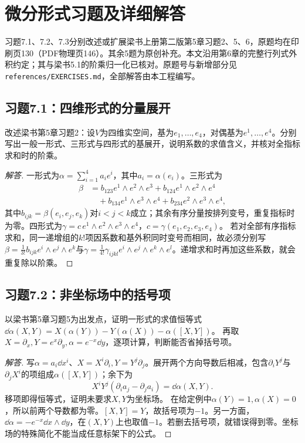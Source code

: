 \section{微分形式习题及详细解答}
习题7.1、7.2、7.3分别改述或扩展梁书上册第二版第5章习题2、5、6，原题均在印刷页130（PDF物理页146）。其余5题为原创补充。本文沿用第6章的完整行列式外积约定；其与梁书5.1的阶乘归一化已核对。原题号与新增部分见\texttt{references/EXERCISES.md}，全部解答由本工程编写。

\subsection*{习题7.1：四维形式的分量展开}
改述梁书第5章习题2：设$V$为四维实空间，基为$e_1,\ldots,e_4$，对偶基为$e^1,\ldots,e^4$。分别写出一般一形式、三形式与四形式的基展开，说明系数的求值含义，并核对全指标求和时的阶乘。
\begin{proof}[解答]
一形式为$\alpha=\sum_{i=1}^4a_i e^i$，其中$a_i=\alpha(e_i)$。三形式为
\begin{align*}
 \beta&=b_{123}e^1\wedge e^2\wedge e^3+b_{124}e^1\wedge e^2\wedge e^4\\
 &\quad+b_{134}e^1\wedge e^3\wedge e^4+b_{234}e^2\wedge e^3\wedge e^4,
\end{align*}
其中$b_{ijk}=\beta(e_i,e_j,e_k)$对$i<j<k$成立；其余有序分量按排列变号，重复指标时为零。四形式为$\gamma=c\,e^1\wedge e^2\wedge e^3\wedge e^4$，$c=\gamma(e_1,e_2,e_3,e_4)$。
若对全部有序指标求和，同一递增组的$k!$项因系数和基外积同时变号而相同，故必须分别写$\beta=\frac1{3!}b_{ijk}e^i\wedge e^j\wedge e^k$与$\gamma=\frac1{4!}\gamma_{ijkl}e^i\wedge e^j\wedge e^k\wedge e^l$。递增求和时再加这些系数，就会重复除以阶乘。
\end{proof}

\subsection*{习题7.2：非坐标场中的括号项}
以梁书第5章习题5为出发点，证明一形式的求值恒等式
$\dd\alpha(X,Y)=X(\alpha(Y))-Y(\alpha(X))-\alpha([X,Y])$。
再取$X=\partial_x,Y=e^x\partial_y,\alpha=e^{-x}\dd y$，逐项计算，判断能否省掉括号项。
\begin{proof}[解答]
写$\alpha=a_i\dd x^i$、$X=X^i\partial_i,Y=Y^j\partial_j$。展开两个方向导数后相减，包含$\partial_iY^j$与$\partial_jX^i$的项组成$\alpha([X,Y])$；余下为
\[
 X^iY^j(\partial_i a_j-\partial_j a_i)=\dd\alpha(X,Y).
\]
移项即得恒等式，证明未要求$X,Y$为坐标场。
在给定例中$\alpha(Y)=1,\alpha(X)=0$，所以前两个导数都为零。$[X,Y]=Y$，故括号项为$-1$。另一方面，$\dd\alpha=-e^{-x}\dd x\wedge\dd y$，在$(X,Y)$上也取值$-1$。若删去括号项，就错误得到零。坐标场的特殊简化不能当成任意标架下的公式。
\end{proof}

